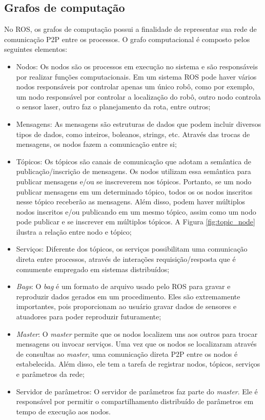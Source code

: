 \subsection{Grafos de computação}

No ROS, os grafos de computação possui a finalidade de representar sua rede de comunicação P2P entre os processos. O grafo computacional é composto pelos seguintes elementos:

\begin{itemize}
    \addtolength{\itemindent}{2em}
    \setlength\itemsep{1em}
    
    \item Nodos: Os nodos são os processos em execução no sistema e são responsáveis por realizar funções computacionais.  Em um sistema ROS pode haver vários nodos responsáveis por controlar apenas um único robô, como por exemplo, um nodo responsável por controlar a localização do robô, outro nodo controla o sensor laser, outro faz o planejamento da rota, entre outros;
    
    \item Mensagens: As mensagens são estruturas de dados que podem incluir diversos tipos de dados, como inteiros, boleanos, strings, etc. Através das trocas de mensagens, os nodos fazem a comunicação entre si;
    
    \item Tópicos: Os tópicos são canais de comunicação que adotam a semântica de publicação/inscrição de mensagens. Os nodos utilizam essa semântica para publicar mensagens e/ou se inscreverem nos tópicos. Portanto, se um nodo publicar mensagens em um determinado tópico, todos os os nodos inscritos nesse tópico receberão as mensagens. Além disso, podem haver múltiplos nodos inscritos e/ou publicando em um mesmo tópico, assim como um nodo pode publicar e se inscrever em múltiplos tópicos. A Figura \ref{fig:topic_node} ilustra a relação entre nodo e tópico;
    
    \item Serviços: Diferente dos tópicos, os serviços possibilitam uma comunicação direta entre processos, através de interações requisição/resposta que é comumente empregado em sistemas distribuídos;
    
    \item \textit{Bags}: O \textit{bag} é um formato de arquivo usado pelo ROS para gravar e reproduzir dados gerados em um procedimento. Eles são extremamente importantes, pois proporcionam ao usuário gravar dados de sensores e atuadores para poder reproduzir futuramente;
    
    \item \textit{Master}: O \textit{master} permite que os nodos localizem uns aos outros para trocar mensagens ou invocar serviços. Uma vez que os nodos se localizaram através de consultas ao \textit{master}, uma comunicação direta P2P entre os nodos é estabelecida. Além disso, ele tem a tarefa de registrar nodos, tópicos, serviços e parâmetros da rede;
    
    \item Servidor de parâmetros: O servidor de parâmetros faz parte do \textit{master}. Ele é responsável por permitir o compartilhamento distribuído de parâmetros em tempo de execução aos nodos.
\end{itemize}
